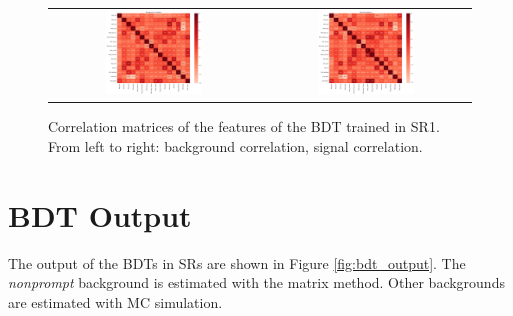 \begin{figure}[tbh!]
 \begin{center}
 \begin{tabular}{cc}
 \includegraphics[width=0.48\textwidth]{figures/Part3/BDT/corr_bkg_SR2}&
 \includegraphics[width=0.48\textwidth]{figures/Part3/BDT/corr_signal_SR2}\\
 \end{tabular}
 \caption{Correlation matrices of the features of the \ac{BDT} trained in \ac{SR}1. From left to right: background correlation, signal correlation.}
 \label{fig:Corr2}
 \end{center}
\end{figure}

\section{BDT Output}
\label{sec:Output}

The output of the \acp{BDT} in \acp{SR} are shown in Figure \ref{fig:bdt_output}. The \emph{nonprompt} background is estimated with the matrix method. Other backgrounds are estimated with \ac{MC} simulation.

